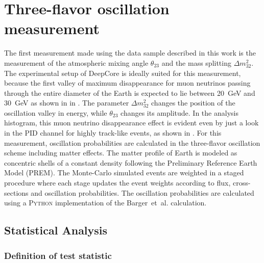\chapter{Three-flavor oscillation measurement}
\setchapterpreamble[u]{\margintoc}

The first measurement made using the data sample described in this work is the measurement of the atmospheric mixing angle $\theta_{23}$ and the mass splitting $\Delta m^2_{32}$.
The experimental setup of DeepCore is ideally suited for this measurement, because the first valley of maximum disappearance for muon neutrinos passing through the entire diameter of the Earth is expected to lie between 20~GeV and 30~GeV as shown in  in .
The parameter $\Delta m^2_{32}$ changes the position of the oscillation valley in energy, while $\theta_{23}$ changes its amplitude.
In the analysis histogram, this muon neutrino disappearance effect is evident even by just a look in the PID channel for highly track-like events, as shown in .
For this measurement, oscillation probabilities are calculated in the three-flavor oscillation scheme including matter effects.
The matter profile of Earth is modeled as concentric shells of a constant density following the Preliminary Reference Earth Model (PREM).
The Monte-Carlo simulated events are weighted in a staged procedure where each stage updates the event weights according to flux, cross-sections and oscillation probabilities.
The oscillation probabilities are calculated using a \textsc{Python} implementation of the Barger~et~al. calculation.

%    

\section{Statistical Analysis}

\subsection{Definition of test statistic}
\label{sec:test-statistic}

